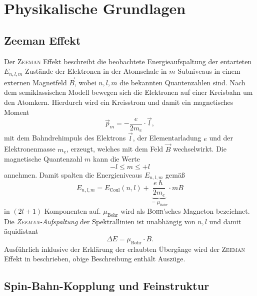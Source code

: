 \documentclass[../bericht.tex]{subfiles}
\begin{document}
  \chapter{Physikalische Grundlagen}

    \section{Zeeman Effekt}
    \label{sec:zeeman}

      Der \textsc{Zeeman} Effekt beschreibt die beobachtete Energieaufspaltung der entarteten $E_{n,l,m}$-Zustände der Elektronen in der Atomschale in $m$ Subniveaus in einem externen Magnetfeld $\vec{B}$, wobei $n,l,m$ die bekannten Quantenzahlen sind. Nach dem semiklassischen Modell bewegen sich die Elektronen auf einer Kreisbahn um den Atomkern. Hierdurch wird ein Kreisstrom und damit ein magnetisches Moment
      \begin{equation*}
        \vec{p}_m=-\frac{e}{2m_e}\cdot \vec{l},
      \end{equation*}
      mit dem Bahndrehimpuls des Elektrons $\vec{l}$, der Elementarladung $e$ und der Elektronenmasse $m_e$, erzeugt, welches mit dem Feld $\vec{B}$ wechselwirkt. Die magnetische Quantenzahl $m$ kann die Werte
      \begin{equation*}
        -l \le m \le +l
      \end{equation*}
      annehmen. Damit spalten die Energieniveaus $E_{n,l,m}$ gemä\ss
      \begin{equation}
        E_{n,l,m}=E_\mathrm{Coul}(n,l)+\underbrace{\frac{e\hslash}{2m_e}}_{=\mu_\mathrm{Bohr}}\cdot mB
      \end{equation}
      in $(2l+1)$ Komponenten auf. $\mu_\mathrm{Bohr}$ wird als \textsc{Bohr}'sches Magneton bezeichnet. Die \textit{\textsc{Zeeman}-Aufspaltung} der Spektrallinien ist unabhängig von $n,l$ und damit äquidistant
      \begin{equation}
        \Delta E=\mu_\mathrm{Bohr}\cdot B.
      \end{equation}
      Ausführlich inklusive der Erklärung der erlaubten Übergänge wird der \textsc{Zeeman} Effekt in \cite{dem:exp3-normaler-zeeman} beschrieben, obige Beschreibung enthält Auszüge.


    \section{Spin-Bahn-Kopplung und Feinstruktur}
    \label{sec:feinstruktur}
\end{document}
